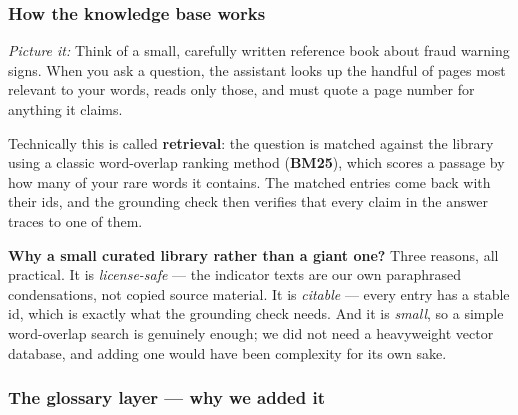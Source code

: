 \documentclass[11pt,a4paper]{article}
\newcommand{\pw}[1]{\textit{\textcolor{accent}{Picture it:}} #1}
\begin{document}
\subsubsection*{How the knowledge base works}

\begin{plain}
\pw{Think of a small, carefully written reference book about fraud warning
signs. When you ask a question, the assistant looks up the handful of pages most
relevant to your words, reads only those, and must quote a page number for
anything it claims.}

Technically this is called \textbf{retrieval}: the question is matched against
the library using a classic word-overlap ranking method (\textbf{BM25}), which
scores a passage by how many of your rare words it contains. The matched entries
come back with their ids, and the grounding check then verifies that every claim
in the answer traces to one of them.
\end{plain}

\textbf{Why a small curated library rather than a giant one?} Three reasons, all
practical. It is \emph{license-safe} --- the indicator texts are our own
paraphrased condensations, not copied source material. It is \emph{citable} ---
every entry has a stable id, which is exactly what the grounding check needs. And
it is \emph{small}, so a simple word-overlap search is genuinely enough; we did
not need a heavyweight vector database, and adding one would have been
complexity for its own sake.

\subsubsection*{The glossary layer --- why we added it}
\end{document}
